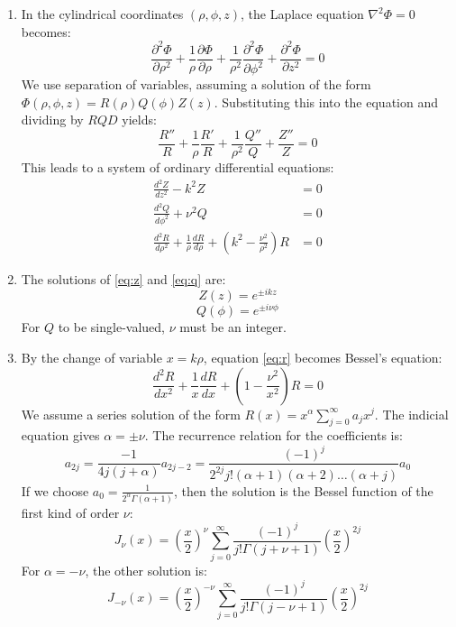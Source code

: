 \documentclass{article}
\begin{document}
	\begin{enumerate}
		\item In the cylindrical coordinates $(\rho, \phi, z)$, the Laplace equation $\nabla^2 \Phi = 0$ becomes:
		$$ \frac{\partial^2 \Phi}{\partial \rho^2} + \frac{1}{\rho} \frac{\partial \Phi}{\partial \rho} + \frac{1}{\rho^2} \frac{\partial^2 \Phi}{\partial \phi^2} + \frac{\partial^2 \Phi}{\partial z^2} = 0 $$
		We use separation of variables, assuming a solution of the form $\Phi(\rho, \phi, z) = R(\rho) Q(\phi) Z(z)$. Substituting this into the equation and dividing by $RQD$ yields:
		$$ \frac{R''}{R} + \frac{1}{\rho} \frac{R'}{R} + \frac{1}{\rho^2} \frac{Q''}{Q} + \frac{Z''}{Z} = 0 $$
		This leads to a system of ordinary differential equations:
		\begin{align}
			\frac{d^2 Z}{dz^2} - k^2 Z &= 0 \label{eq:z} \\
			\frac{d^2 Q}{d\phi^2} + \nu^2 Q &= 0 \label{eq:q} \\
			\frac{d^2 R}{d\rho^2} + \frac{1}{\rho} \frac{dR}{d\rho} + \left(k^2 - \frac{\nu^2}{\rho^2}\right) R &= 0 \label{eq:r}
		\end{align}
		
		\item The solutions of \eqref{eq:z} and \eqref{eq:q} are:
		$$ Z(z) = e^{\pm ikz} $$
		$$ Q(\phi) = e^{\pm i\nu\phi} $$
		For $Q$ to be single-valued, $\nu$ must be an integer.
		
		\item By the change of variable $x = k\rho$, equation \eqref{eq:r} becomes Bessel's equation:
		$$ \frac{d^2 R}{dx^2} + \frac{1}{x} \frac{dR}{dx} + \left(1 - \frac{\nu^2}{x^2}\right) R = 0 $$
		We assume a series solution of the form $R(x) = x^\alpha \sum_{j=0}^{\infty} a_j x^j$. The indicial equation gives $\alpha = \pm \nu$.
		The recurrence relation for the coefficients is:
		$$ a_{2j} = \frac{-1}{4j(j+\alpha)} a_{2j-2} = \frac{(-1)^j}{2^{2j} j! (\alpha+1)(\alpha+2)\dots(\alpha+j)} a_0 $$
		If we choose $a_0 = \frac{1}{2^\alpha \Gamma(\alpha+1)}$, then the solution is the Bessel function of the first kind of order $\nu$:
		$$ J_\nu(x) = \left(\frac{x}{2}\right)^\nu \sum_{j=0}^{\infty} \frac{(-1)^j}{j! \Gamma(j+\nu+1)} \left(\frac{x}{2}\right)^{2j} $$
		For $\alpha = -\nu$, the other solution is:
		$$ J_{-\nu}(x) = \left(\frac{x}{2}\right)^{-\nu} \sum_{j=0}^{\infty} \frac{(-1)^j}{j! \Gamma(j-\nu+1)} \left(\frac{x}{2}\right)^{2j} $$
	\end{enumerate}
	
\end{document}
